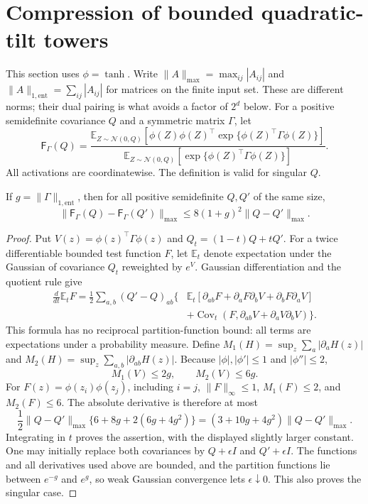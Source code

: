 \section{Compression of bounded quadratic-tilt towers}\label{sec:critical-compression}
This section uses $\phi=\tanh$. Write $\|A\|_{\max}=\max_{ij}|A_{ij}|$ and
$\|A\|_{1,\mathrm{ent}}=\sum_{ij}|A_{ij}|$ for matrices on the finite input
set. These are different norms; their dual pairing is what avoids a factor
of $2^d$ below.
For a positive semidefinite covariance $Q$ and a symmetric matrix $\Gamma$,
let
\[
 \mathsf F_\Gamma(Q)=
 \frac{\mathbb E_{Z\sim\mathcal N(0,Q)}
 [\phi(Z)\phi(Z)^\top\exp\{\phi(Z)^\top\Gamma\phi(Z)\}]}
 {\mathbb E_{Z\sim\mathcal N(0,Q)}
 [\exp\{\phi(Z)^\top\Gamma\phi(Z)\}]}.
\]
All activations are coordinatewise. The definition is valid for singular $Q$.

\begin{lemma}\label{lem:tilted-covariance}
If $g=\|\Gamma\|_{1,\mathrm{ent}}$, then for all positive semidefinite
$Q,Q'$ of the same size,
\[
 \|\mathsf F_\Gamma(Q)-\mathsf F_\Gamma(Q')\|_{\max}
 \leq 8(1+g)^2\|Q-Q'\|_{\max}.
\]
\end{lemma}
\begin{proof}
Put $V(z)=\phi(z)^\top\Gamma\phi(z)$ and
$Q_t=(1-t)Q+tQ'$. For a twice differentiable bounded test function $F$, let
$\mathbb E_t$ denote expectation under the Gaussian of covariance $Q_t$
reweighted by $e^V$. Gaussian differentiation and the quotient rule give
\begin{align*}
 \frac{d}{dt}\mathbb E_tF
 =\frac12\sum_{a,b}(Q'-Q)_{ab}\bigl\{
 &\mathbb E_t[\partial_{ab}F+
       \partial_aF\partial_bV+\partial_bF\partial_aV]\\
 &+\operatorname{Cov}_t(F,\partial_{ab}V+
                                   \partial_aV\partial_bV)\bigr\}.
\end{align*}
This formula has no reciprocal partition-function bound: all terms are
expectations under a probability measure. Define
$M_1(H)=\sup_z\sum_a|\partial_aH(z)|$ and
$M_2(H)=\sup_z\sum_{a,b}|\partial_{ab}H(z)|$.
Because $|\phi|,|\phi'|\leq1$ and $|\phi''|\leq2$,
\[
 M_1(V)\leq2g,\qquad M_2(V)\leq6g.
\]
For $F(z)=\phi(z_i)\phi(z_j)$, including $i=j$,
$\|F\|_\infty\leq1$, $M_1(F)\leq2$, and $M_2(F)\leq6$.
The absolute derivative is therefore at most
\[
 \frac12\|Q-Q'\|_{\max}
 \{6+8g+2(6g+4g^2)\}
 =(3+10g+4g^2)\|Q-Q'\|_{\max}.
\]
Integrating in $t$ proves the assertion, with the displayed slightly larger
constant. One may initially replace both covariances by $Q+\epsilon I$ and
$Q'+\epsilon I$. The functions and all derivatives used above are bounded,
and the partition functions lie between $e^{-g}$ and $e^g$, so weak Gaussian
convergence lets $\epsilon\downarrow0$. This also proves the singular case.
\end{proof}

